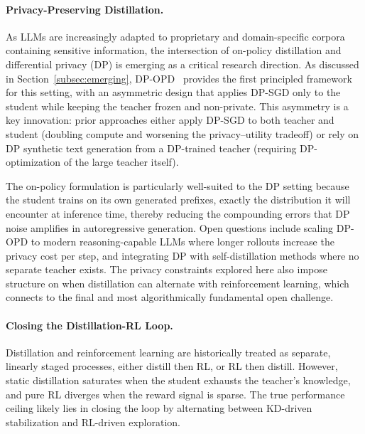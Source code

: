 \documentclass{article} %
\begin{document}
\paragraph{Privacy-Preserving Distillation.}
As LLMs are increasingly adapted to proprietary and domain-specific corpora containing sensitive information, the intersection of on-policy distillation and differential privacy (DP) is emerging as a critical research direction. As discussed in Section~\ref{subsec:emerging}, DP-OPD~\citep{khadem2026dpopd} provides the first principled framework for this setting, with an asymmetric design that applies DP-SGD only to the student while keeping the teacher frozen and non-private. This asymmetry is a key innovation: prior approaches either apply DP-SGD to both teacher and student (doubling compute and worsening the privacy--utility tradeoff) or rely on DP synthetic text generation from a DP-trained teacher (requiring DP-optimization of the large teacher itself).

The on-policy formulation is particularly well-suited to the DP setting because the student trains on its own generated prefixes, exactly the distribution it will encounter at inference time, thereby reducing the compounding errors that DP noise amplifies in autoregressive generation. Open questions include scaling DP-OPD to modern reasoning-capable LLMs where longer rollouts increase the privacy cost per step, and integrating DP with self-distillation methods where no separate teacher exists. The privacy constraints explored here also impose structure on when distillation can alternate with reinforcement learning, which connects to the final and most algorithmically fundamental open challenge.

\paragraph{Closing the Distillation-RL Loop.}
Distillation and reinforcement learning are historically treated as separate, linearly staged processes, either distill then RL, or RL then distill. However, static distillation saturates when the student exhausts the teacher's knowledge, and pure RL diverges when the reward signal is sparse. The true performance ceiling likely lies in closing the loop by alternating between KD-driven stabilization and RL-driven exploration.
\end{document}
